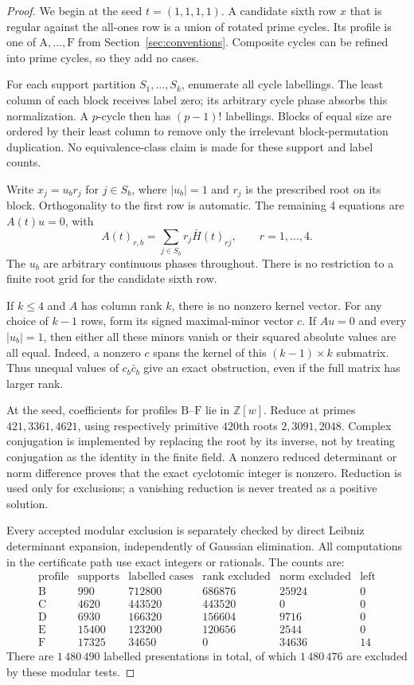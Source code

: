 \documentclass[11pt,a4paper]{article}
\theoremstyle{plain}
\theoremstyle{definition}
\theoremstyle{plain}
\begin{document}
\begin{proof}
We begin at the seed $t=(1,1,1,1)$.
\medskip
A candidate sixth row $x$ that is regular against the all-ones row is a union of rotated prime cycles. Its profile is one of $\mathrm{A},\ldots,\mathrm{F}$ from Section~\ref{sec:conventions}. Composite cycles can be refined into prime cycles, so they add no cases.

For each support partition $S_1,\ldots,S_k$, enumerate all cycle labellings. The least column of each block receives label zero; its arbitrary cycle phase absorbs this normalization. A $p$-cycle then has $(p-1)!$ labellings. Blocks of equal size are ordered by their least column to remove only the irrelevant block-permutation duplication. No equivalence-class claim is made for these support and label counts.

Write $x_j=u_br_j$ for $j\in S_b$, where $|u_b|=1$ and $r_j$ is the prescribed root on its block. Orthogonality to the first row is automatic. The remaining 4 equations are $A(t)u=0$, with
$$A(t)_{r,b}=\sum_{j\in S_b}r_j\bar H(t)_{rj},\qquad r=1,\ldots,4.$$
The $u_b$ are arbitrary continuous phases throughout. There is no restriction to a finite root grid for the candidate sixth row.

\medskip
If $k\le4$ and $A$ has column rank $k$, there is no nonzero kernel vector. For any choice of $k-1$ rows, form its signed maximal-minor vector $c$. If $Au=0$ and every $|u_b|=1$, then either all these minors vanish or their squared absolute values are all equal. Indeed, a nonzero $c$ spans the kernel of this $(k-1)\times k$ submatrix. Thus unequal values of $c_b\bar c_b$ give an exact obstruction, even if the full matrix has larger rank.

At the seed, coefficients for profiles $\mathrm{B}$--$\mathrm{F}$ lie in $\mathbb{Z}[w]$. Reduce at primes $421,3361,4621$, using respectively primitive $420$th roots $2,3091,2048$. Complex conjugation is implemented by replacing the root by its inverse, not by treating conjugation as the identity in the finite field. A nonzero reduced determinant or norm difference proves that the exact cyclotomic integer is nonzero. Reduction is used only for exclusions; a vanishing reduction is never treated as a positive solution.

Every accepted modular exclusion is separately checked by direct Leibniz determinant expansion, independently of Gaussian elimination. All computations in the certificate path use exact integers or rationals. The counts are:
$$\begin{array}{c|rrrrr}
\text{profile}&\text{supports}&\text{labelled cases}&\text{rank excluded}&\text{norm excluded}&\text{left}\\\hline
\mathrm{B}&990&712800&686876&25924&0\\
\mathrm{C}&4620&443520&443520&0&0\\
\mathrm{D}&6930&166320&156604&9716&0\\
\mathrm{E}&15400&123200&120656&2544&0\\
\mathrm{F}&17325&34650&0&34636&14
\end{array}$$
There are $1\,480\,490$ labelled presentations in total, of which $1\,480\,476$ are excluded by these modular tests.


\end{proof}
\end{document}
